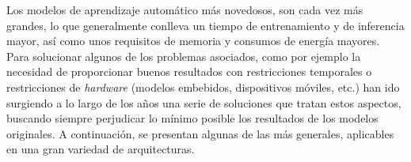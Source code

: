 \documentclass[a4paper, 11pt]{article}
\begin{document}

Los modelos de aprendizaje automático más novedosos, son cada vez más grandes, lo que generalmente conlleva un tiempo de entrenamiento y de inferencia mayor, así como unos requisitos de memoria y consumos de energía mayores. Para solucionar algunos de los problemas asociados, como por ejemplo la necesidad de proporcionar buenos resultados con restricciones temporales o restricciones de \textit{hardware} (modelos embebidos, dispositivos móviles, etc.) han ido surgiendo a lo largo de los años una serie de soluciones que tratan estos aspectos, buscando siempre perjudicar lo mínimo posible los resultados de los modelos originales. A continuación, se presentan algunas de las más generales, aplicables en una gran variedad de arquitecturas.
\end{document}
